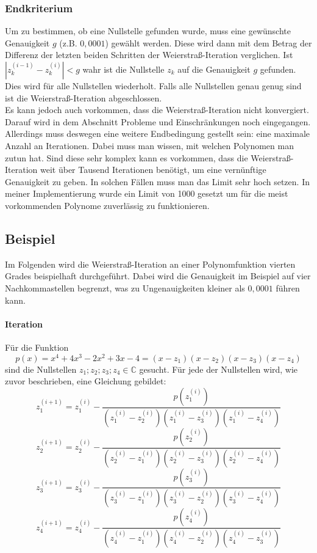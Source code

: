 \documentclass[12pt]{article}
\begin{document}
\subsubsection{Endkriterium}
Um zu bestimmen, ob eine Nullstelle gefunden wurde, muss eine gewünschte Genauigkeit $g$ (z.B. $0,0001$) gewählt werden. Diese wird dann mit dem Betrag der Differenz der letzten beiden Schritten der Weierstraß-Iteration verglichen. Ist $|z_k^{(i-1)}-z_k^{(i)}| < g$ wahr ist die Nullstelle $z_k$ auf die Genauigkeit $g$ gefunden. Dies wird für alle Nullstellen wiederholt. Falls alle Nullstellen genau genug sind ist die Weierstraß-Iteration abgeschlossen.\\
Es kann jedoch auch vorkommen, dass die Weierstraß-Iteration nicht konvergiert. Darauf wird in dem Abschnitt Probleme und Einschränkungen noch eingegangen. Allerdings muss deswegen eine weitere Endbedingung gestellt sein: eine maximale Anzahl an Iterationen. Dabei muss man wissen, mit welchen Polynomen man zutun hat. Sind diese sehr komplex kann es vorkommen, dass die Weierstraß-Iteration weit über Tausend Iterationen benötigt, um eine vernünftige Genauigkeit zu geben. In solchen Fällen muss man das Limit sehr hoch setzen. In meiner Implementierung wurde ein Limit von 1000 gesetzt um für die meist vorkommenden Polynome zuverlässig zu funktionieren.

\subsection{Beispiel}
Im Folgenden wird die Weierstraß-Iteration an einer Polynomfunktion vierten Grades beispielhaft durchgeführt. Dabei wird die Genauigkeit im Beispiel auf vier Nachkommastellen begrenzt, was zu Ungenauigkeiten kleiner als $0,0001$ führen kann.
\paragraph{Iteration}
Für die Funktion
\begin{equation*}
    p(x) = x^4 + 4x^3 - 2x^2 + 3x - 4 = (x-z_1)(x-z_2)(x-z_3)(x-z_4)
\end{equation*}
sind die Nullstellen $z_1;z_2;z_3;z_4 \in \mathbb{C}$ gesucht. Für jede der Nullstellen wird, wie zuvor beschrieben, eine Gleichung gebildet:
\begin{equation*}
    z_1^{(i+1)} = z_1^{(i)}-\frac{p(z_1^{(i)})}{(z_1^{(i)}-z_2^{(i)})(z_1^{(i)}-z_3^{(i)})(z_1^{(i)}-z_4^{(i)})}
\end{equation*}
\begin{equation*}
    z_2^{(i+1)} = z_2^{(i)}-\frac{p(z_2^{(i)})}{(z_2^{(i)}-z_1^{(i)})(z_2^{(i)}-z_3^{(i)})(z_2^{(i)}-z_4^{(i)})}
\end{equation*}
\begin{equation*}
    z_3^{(i+1)} = z_3^{(i)}-\frac{p(z_3^{(i)})}{(z_3^{(i)}-z_1^{(i)})(z_3^{(i)}-z_2^{(i)})(z_3^{(i)}-z_4^{(i)})}
\end{equation*}
\begin{equation*}
    z_4^{(i+1)} = z_4^{(i)}-\frac{p(z_4^{(i)})}{(z_4^{(i)}-z_1^{(i)})(z_4^{(i)}-z_2^{(i)})(z_4^{(i)}-z_3^{(i)})}
\end{equation*}
\end{document}
